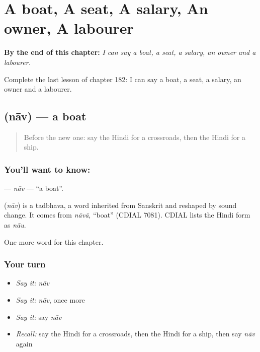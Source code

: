 
\chapter{A boat, A seat, A salary, An owner, A labourer}
\label{ch:hi-a-boat-a-seat-a-salary-an-owner-a-labourer}

\begin{chapteropening}
\textbf{By the end of this chapter:} \emph{I can say a boat, a seat, a salary, an owner and a labourer.}

Complete the last lesson of chapter 182: I can say a boat, a seat, a salary, an owner and a labourer.
\end{chapteropening}

\section[\texorpdfstring{\hi{नाव} (nāv)}{नाव (nāv)}]{ (nāv) — a boat}

\label{lesson:HI-C182-nav}



\begin{quote}
Before the new one: say the Hindi for a crossroads, then the Hindi for a ship.
\end{quote}

\subsection*{You'll want to know: }
\textbf{} — \emph{nāv} — \textquotedblleft{}a boat\textquotedblright{}.

\begin{cousinweb}
\textbf{} (\emph{nāv}) is a tadbhava, a word inherited from Sanskrit and reshaped by sound change. It comes from \emph{nāvā}, \textquotedblleft{}boat\textquotedblright{} (CDIAL 7081). CDIAL lists the Hindi form as \emph{nāu}.
\end{cousinweb}

\begin{grammarlens}[title={What you've built}]
One more word for this chapter.
\end{grammarlens}

\subsection*{Your turn}
\begin{itemize}
\raggedright
  \item \emph{Say it:} \emph{nāv}
  \item \emph{Say it:} \emph{nāv}, once more
  \item \emph{Say it:} say \emph{nāv}
  \item \emph{Recall:} say the Hindi for a crossroads, then the Hindi for a ship, then say \emph{nāv} again
\end{itemize}

